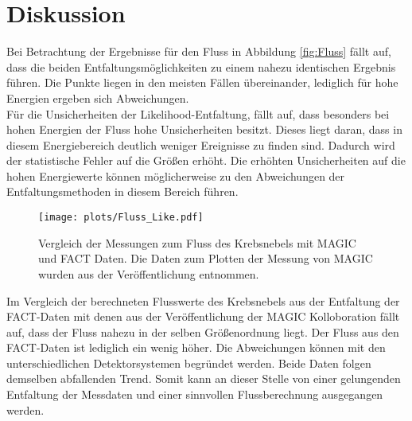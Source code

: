 \section{Diskussion}
Bei Betrachtung der Ergebnisse für den Fluss in Abbildung \ref{fig:Fluss} fällt auf, dass die beiden Entfaltungsmöglichkeiten zu einem nahezu identischen Ergebnis führen. Die Punkte liegen in den meisten Fällen übereinander, lediglich für hohe Energien ergeben sich Abweichungen.\\
Für die Unsicherheiten der Likelihood-Entfaltung, fällt auf, dass besonders bei hohen Energien der Fluss hohe Unsicherheiten besitzt. Dieses liegt daran, dass in diesem Energiebereich deutlich weniger Ereignisse zu finden sind. Dadurch wird der statistische Fehler auf die Größen erhöht. Die erhöhten Unsicherheiten auf die hohen Energiewerte können möglicherweise zu den Abweichungen der Entfaltungsmethoden in diesem Bereich führen.
\begin{figure}
	\texttt{[image: plots/Fluss\_Like.pdf]}
	\caption{Vergleich der Messungen zum Fluss des Krebsnebels mit MAGIC und FACT Daten. Die Daten zum Plotten der Messung von MAGIC wurden aus der Veröffentlichung \cite{Aleksic:2014jva} entnommen.}
	\label{fig:VGL}
\end{figure}
\FloatBarrier
Im Vergleich der berechneten Flusswerte des Krebsnebels aus der Entfaltung der FACT-Daten mit denen aus der Veröffentlichung \cite{Aleksic:2014jva} der MAGIC Kolloboration fällt auf, dass der Fluss nahezu in der selben Größenordnung liegt. Der Fluss aus den FACT-Daten ist lediglich ein wenig höher. Die Abweichungen können mit den unterschiedlichen Detektorsystemen begründet werden. Beide Daten folgen demselben abfallenden Trend. Somit kann an dieser Stelle von einer gelungenden Entfaltung der Messdaten und einer sinnvollen Flussberechnung ausgegangen werden.
